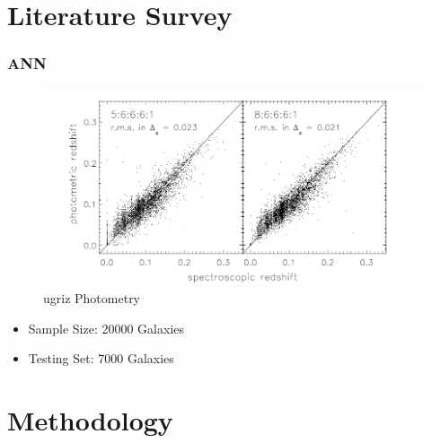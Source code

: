 \documentclass{beamer}
\begin{document}
\section{Literature Survey}
\begin{frame}
        \frametitle{ANN}
        \begin{figure}
            \includegraphics[scale=0.3]{img/lit_survay.png}
            \caption*{ugriz Photometry}
        \end{figure}
        \begin{itemize}
            \item Sample Size: 20000 Galaxies
            \item Testing Set: 7000 Galaxies
        \end{itemize}
        \end{frame}
\section{Methodology}
\end{document}
